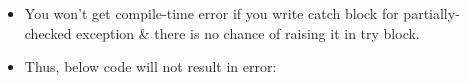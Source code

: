\begin{flushleft}
\begin{itemize}
			\item You won't get compile-time error if you write catch block for partially-checked exception \& there is no chance of raising it in try block.
			\item Thus, below code will not result in error:
			\bigskip
			
			\bigskip
		\end{itemize}
		
		

		
\end{flushleft}

\newpage




